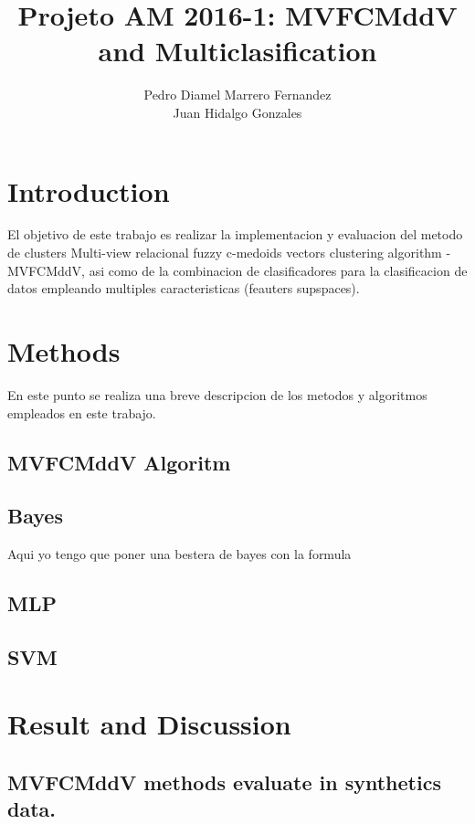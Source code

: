 \documentclass[12pt]{article}
\author{Pedro Diamel Marrero Fernandez \\ Juan Hidalgo Gonzales}
\title{Projeto AM 2016-1: MVFCMddV and Multiclasification}
\begin{document}
\maketitle



\section*{Introduction}

El objetivo de este trabajo es realizar la implementacion y evaluacion del metodo de clusters Multi-view relacional fuzzy c-medoids vectors clustering algorithm - MVFCMddV, asi como de la combinacion de clasificadores para la clasificacion de datos empleando multiples caracteristicas (feauters supspaces).  

\section{Methods}
En este punto se realiza una breve descripcion de los metodos y algoritmos empleados en este trabajo.

\subsection{MVFCMddV Algoritm}

\subsection{Bayes}
Aqui yo tengo que poner una bestera de bayes con la formula 

\subsection{MLP}

\subsection{SVM}



\section{Result and Discussion }


\subsection{MVFCMddV methods evaluate in synthetics data.}
\end{document}

